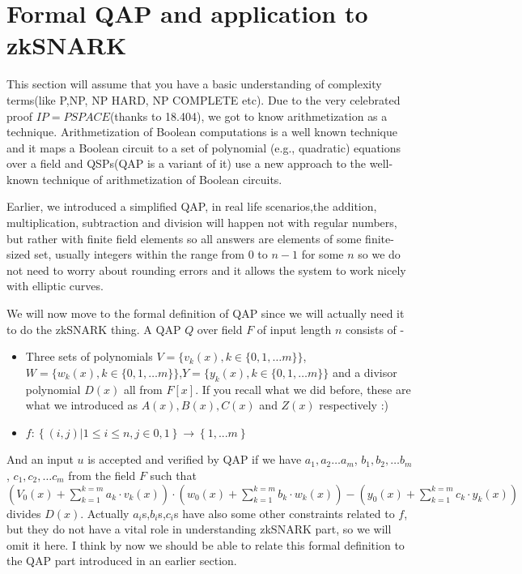 \documentclass[12pt,letterpaper]{article}
\begin{document}
\section{Formal QAP and application to zkSNARK}
This section will assume that you have a basic understanding of complexity terms(like P,NP, NP HARD, NP COMPLETE etc). Due to the very celebrated proof $IP=PSPACE$(thanks to 18.404), we got to know arithmetization as a technique. Arithmetization of Boolean computations is a well known technique and it maps
a Boolean circuit to a set of polynomial (e.g., quadratic) equations over a field and QSPs(QAP is a variant of it) use a new approach to the well-known technique of arithmetization of Boolean circuits.

Earlier, we introduced a simplified QAP, in real life scenarios,the addition, multiplication, subtraction and division will happen not with regular numbers, but rather with finite field elements so all answers are elements of some finite-sized set, usually integers within the range from $0$ to $n-1$ for some $n$ so we do not need to worry about rounding errors and it allows the system to work nicely with elliptic curves.

We will now move to the formal definition of QAP since we will actually need it to do the zkSNARK thing. A QAP $Q$ over field $F$ of input length $n$ consists of - 
\begin{itemize}
    \item Three sets of polynomials $V=\{v_k(x),k \in \{0,1,\dots m\}\}$, $W=\{w_k(x),k \in \{0,1,\dots m\}\}$,$Y=\{y_k(x), k \in \{0,1,\dots m\}\}$ and a divisor polynomial $D(x)$ all from $F[x]$. If you recall what we did before, these are what we introduced as $A(x),B(x),C(x)$ and $Z(x)$ respectively :)
    \item $f: \left\{(i, j) |1\leq i \leq n, j\in{0,1} \right\} \to \left\{1, ... m\right\}$
\end{itemize}
And an input $u$ is accepted and verified by QAP if we have $a_1,a_2\dots a_m$, $b_1,b_2,\dots b_m$, $c_1,c_2,\dots c_m$ from the field $F$ such that $(V_0 (x) + \sum_{k = 1}^ {k=m}a_k\cdot v_k(x)) \cdot(w_0 (x) + \sum_{k = 1} ^{k= m}b_k\cdot w_k(x)) -(y_0(x)+\sum_{k = 1}^{k=m}c_k\cdot y_k (x))$ divides $D(x)$. Actually $a_i$s,$b_i$s,$c_i$s have also some other constraints related to $f$, but they do not have a vital role in understanding zkSNARK part, so we will omit it here. I think by now we should be able to relate this formal definition to the QAP part introduced in an earlier section.
\end{document}
